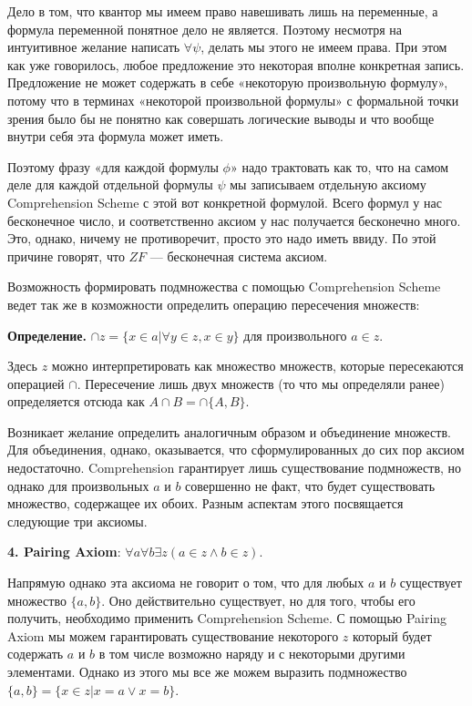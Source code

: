 Дело в том, что квантор мы имеем право навешивать лишь на переменные, а формула переменной понятное дело не является. Поэтому несмотря на интуитивное желание написать $\forall\psi$, делать мы этого не имеем права. При этом как уже говорилось, любое предложение это некоторая вполне конкретная запись. Предложение не может содержать в себе «некоторую произвольную формулу», потому что в терминах «некоторой произвольной формулы» с формальной точки зрения было бы не понятно как совершать логические выводы и что вообще внутри себя эта формула может иметь.

Поэтому фразу «для каждой формулы $\phi$» надо трактовать как то, что на самом деле для каждой отдельной формулы $\psi$ мы записываем отдельную аксиому Comprehension Scheme с этой вот конкретной формулой. Всего формул у нас бесконечное число, и соответственно аксиом у нас получается бесконечно много. Это, однако, ничему не противоречит, просто это надо иметь ввиду. По этой причине говорят, что $ZF$ — бесконечная система аксиом.

Возможность формировать подмножества с помощью Comprehension Scheme ведет так же в козможности определить операцию пересечения множеств:

{\bfseries Определение. }$\cap z = \{x \in a| \forall y \in z, x\in y\}$ для произвольного $a \in z$.

Здесь $z$ можно интерпретировать как множество множеств, которые пересекаются операцией $\cap$. Пересечение лишь двух множеств (то что мы определяли ранее) определяется отсюда как $A\cap B = \cap\{A, B\}$.

Возникает желание определить аналогичным образом и объединение множеств. Для объединения, однако, оказывается, что сформулированных до сих пор аксиом недостаточно. Comprehension гарантирует лишь существование подмножеств, но однако для произвольных $a$ и $b$ совершенно не факт, что будет существовать множество, содержащее их обоих. Разным аспектам этого посвящается следующие три аксиомы.

{\bfseries 4. Pairing Axiom}: $\forall a \forall b \exists z (a\in z \wedge b \in z)$.

Напрямую однако эта аксиома не говорит о том, что для любых $a$ и $b$ существует множество $\{a, b\}$. Оно действительно существует, но для того, чтобы его получить, необходимо применить Comprehension Scheme. С помощью Pairing Axiom мы можем гарантировать существование некоторого $z$ который будет содержать $a$ и $b$ в том числе возможно наряду и с некоторыми другими элементами. Однако из этого мы все же можем выразить подмножество $\{a, b\} = \{x \in z| x = a \vee x = b\}$.

